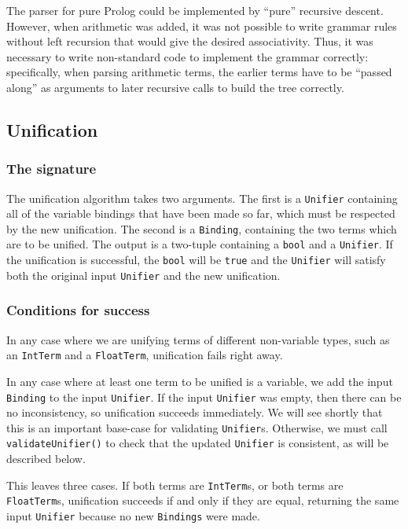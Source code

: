 \documentclass[12pt]{article}
\begin{document}
The parser for pure Prolog could be implemented by ``pure'' recursive descent. 
However, when arithmetic was added, it was not possible to write grammar rules without left recursion that would give the desired associativity. 
Thus, it was necessary to write non-standard code to implement the grammar correctly: specifically, when parsing arithmetic terms, the earlier terms have to be ``passed along'' as arguments to later recursive calls to build the tree correctly.

\subsection{Unification}

\subsubsection{The signature}

The unification algorithm takes two arguments. 
The first is a \verb|Unifier| containing all of the variable bindings that have been made so far, which must be respected by the new unification. 
The second is a \verb|Binding|, containing the two terms which are to be unified. 
The output is a two-tuple containing a \verb|bool| and a \verb|Unifier|. 
If the unification is successful, the \verb|bool| will be \verb|true| and the \verb|Unifier| will satisfy both the original input \verb|Unifier| and the new unification.

\subsubsection{Conditions for success}

In any case where we are unifying terms of different non-variable types, such as an \verb|IntTerm| and a \verb|FloatTerm|, unification fails right away. 

In any case where at least one term to be unified is a variable, we add the input \verb|Binding| to the input \verb|Unifier|. 
If the input \verb|Unifier| was empty, then there can be no inconsistency, so unification succeeds immediately. 
We will see shortly that this is an important base-case for validating \verb|Unifier|s. 
Otherwise, we must call \verb|validateUnifier()| to check that the updated \verb|Unifier| is consistent, as will be described below.

This leaves three cases. 
If both terms are \verb|IntTerm|s, or both terms are \verb|FloatTerm|s, unification succeeds if and only if they are equal, returning the same input \verb|Unifier| because no new \verb|Bindings| were made. 
\end{document}
